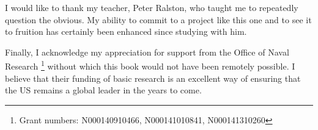I would like to thank my teacher, Peter Ralston, who taught me to repeatedly question the obvious. My ability to commit to a project like this one and to see it to fruition has certainly been enhanced since studying with him.

Finally, I acknowledge my appreciation for support from the Office of Naval Research
\footnote{Grant numbers: N000140910466, N000141010841, N000141310260} 
without which this book would not have been remotely possible. I believe that their funding of basic research is an excellent way of ensuring that the US remains a global leader in the years to come.


